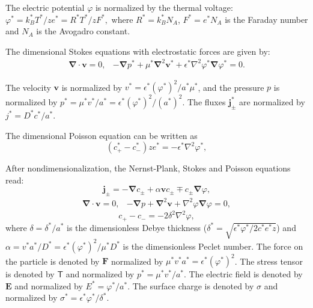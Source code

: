 \documentclass[10pt]{ijnam}
\newcommand\eps \epsilon
\newcommand\Laplacian{\nabla^2}
\newcommand\bnabla{\boldsymbol{\nabla}}
\newcommand\bLaplacian{\boldsymbol{\nabla}^2}
\newcommand\bv{\boldsymbol{v}}
\newcommand\bE{\boldsymbol{E}}
\newcommand\bj{\boldsymbol{j}}
\newcommand\bF{\boldsymbol{F}}
\newcommand\tT{\mathsf{T}}
\begin{document}
The electric potential $\varphi$ is normalized by the thermal voltage:
$\varphi^* = {k_B^* T^*}/{z e^*} = {R^* T^*}/{z F^*},$
where $R^* = k_B^* N_A$, $F^* = e^* N_A$ is the Faraday number and $N_A$ is the Avogadro constant.

The dimensional Stokes equations with electrostatic forces are given by:
\begin{equation} \begin{array}{cc}
\bnabla \cdot \bv = 0, &
-\bnabla p^* + \mu^* \bLaplacian \bv^* + \eps^* \Laplacian \varphi^* 
\bnabla \varphi^* = 0.
\end{array}\end{equation}

The velocity $\bv$ is normalized by $v^* = {\eps^* (\varphi^*)^2}/{a^* \mu^*}$,
and the pressure $p$ is normalized by $p^* = {\mu^* v^*}/{a^*} = {\eps^* (\varphi^*)^2}/{(a^*)^2}$.
The fluxes $\bj^*_\pm$ are normalized by $j^* = {D^* c^*}/{a^*}$.

The dimensional Poisson equation can be written as
\begin{equation}
(c^*_+ - c^*_-) z e^* = -\eps^* \Laplacian \varphi^*,
\end{equation}

After nondimensionalization, the Nernst-Plank, Stokes and Poisson equations read:
\begin{equation} \label{eq:nernst}
\bj_\pm = 
-\bnabla c_\pm + \alpha \bv c_\pm \mp c_\pm \bnabla \varphi,
\end{equation}
\begin{equation} \label{eq:stokes}
\begin{array}{cc}
\bnabla \cdot \bv = 0, &
-\bnabla p + \bLaplacian \bv + \Laplacian \varphi \bnabla \varphi = 0, 
\end{array}
\end{equation}
\begin{equation} \label{eq:poisson}
c_+ - c_- = -2\delta^2 \Laplacian \varphi,
\end{equation}
where $\delta = {\delta^*}/{a^*}$ is the dimensionless Debye thickness 
($\delta^* = \sqrt{{\eps^* \varphi^*}/{2 c^* e^* z}}$) and 
$\alpha = {v^* a^*}/{D^*} = {\eps^* (\varphi^*)^2}/{\mu^* D^*}$ 
is the dimensionless Peclet number.
The force on the particle is denoted by $\bF$ normalized by $\mu^* v^* a^* = \eps^* (\varphi^*)^2$.
The stress tensor is denoted by $\tT$ and normalized by $p^* = \mu^* v^* / a^*$.
The electric field is denoted by $\bE$ and normalized by $E^* = \varphi^* / a^*$.
The surface charge is denoted by $\sigma$ and normalized by $\sigma^* = \eps^* \varphi^* / \delta^*$.
\end{document}
